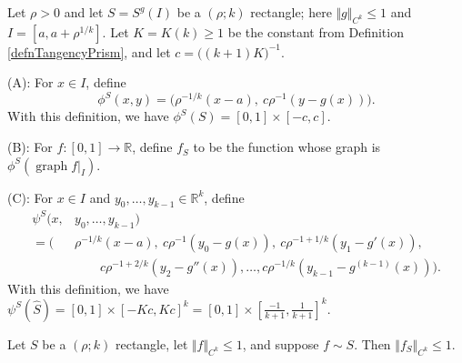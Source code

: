 \documentclass[10pt,a4paper]{amsart}
\newcommand{\RR}{\mathbb{R}}
\begin{document}
\begin{defn}\label{pullbackRect}
Let $\rho>0$ and let $S=S^g(I)$ be a $(\rho;k)$ rectangle; here $\Vert g \Vert_{C^k}\leq 1$ and $I=[a, a+\rho^{1/k}]$. Let $K=K(k)\geq 1$ be the constant from Definition \ref{defnTangencyPrism}, and let $c=\big((k+1)K\big)^{-1}$. 

\smallskip

\noindent (A): For $x\in I$, define
\[
\phi^S(x,y) = \big( \rho^{-1/k}(x-a),\ c\rho^{-1}(y-g(x))\big).
\]
With this definition, we have $\phi^S(S)=[0,1]\times [-c,c]$.

\smallskip

\noindent (B): For $f\colon [0,1]\to\RR$, define $f_S$ to be the function whose graph is $\phi^S(\operatorname{graph}f|_I)$. 

\smallskip

\noindent (C): For $x\in I$ and $y_0,\ldots,y_{k-1}\in\RR^k$, define 
\begin{equation*}
\begin{split}
\psi^S(x,&y_0,\ldots,y_{k-1}) \\
= \Big(&\rho^{-1/k}(x-a),\ c\rho^{-1}(y_0-g(x)),\ c\rho^{-1+1/k}(y_1-g'(x)),\\
& \qquad c\rho^{-1+2/k}(y_2-g''(x)),\ldots, c\rho^{-1/k}(y_{k-1}-g^{(k-1)}(x))\Big).
\end{split}
\end{equation*}
With this definition, we have $\psi^S(\hat S)=[0,1]\times [-Kc,Kc]^k = [0,1]\times [\frac{-1}{k+1},\frac{1}{k+1}]^k$.
\end{defn}

\begin{lem}\label{CkNormRectangleRescaling}
Let $S$ be a $(\rho;k)$ rectangle, let $\Vert f\Vert_{C^k}\leq 1$, and suppose $f\sim S$. Then $\Vert f_S \Vert_{C^k}\leq 1$. 
\end{lem}
\end{document}
